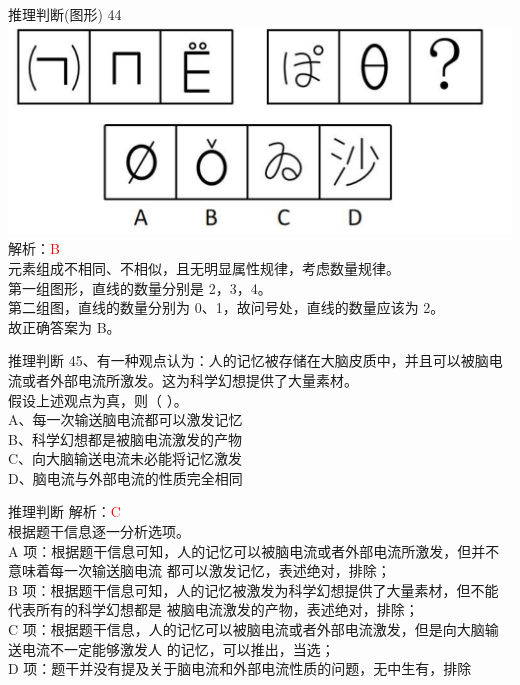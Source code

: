 \documentclass[aspectratio=169]{beamer}
\begin{document}
\begin{frame}[t]{推理判断(图形)}
    44\\
    \includegraphics[scale=0.25]{44}\\ 
    解析：\textcolor{red}{B}\\
    元素组成不相同、不相似，且无明显属性规律，考虑数量规律。\\
    第一组图形，直线的数量分别是 2，3，4。\\
    第二组图，直线的数量分别为 0、1，故问号处，直线的数量应该为 2。\\
    故正确答案为 B。\\
\end{frame}





\begin{frame}[t]{推理判断}
    45、有一种观点认为：人的记忆被存储在大脑皮质中，并且可以被脑电流或者外部电流所激发。这为科学幻想提供了大量素材。\\
    假设上述观点为真，则（ ）。      \\
    A、每一次输送脑电流都可以激发记忆\\
    B、科学幻想都是被脑电流激发的产物\\
    C、向大脑输送电流未必能将记忆激发\\
    D、脑电流与外部电流的性质完全相同\\
\end{frame}


\begin{frame}[t]{推理判断}
    解析：\textcolor{red}{C}\\
    根据题干信息逐一分析选项。\\
    A 项：根据题干信息可知，人的记忆可以被脑电流或者外部电流所激发，但并不意味着每一次输送脑电流
    都可以激发记忆，表述绝对，排除；\\
    B 项：根据题干信息可知，人的记忆被激发为科学幻想提供了大量素材，但不能代表所有的科学幻想都是
    被脑电流激发的产物，表述绝对，排除；\\
    C 项：根据题干信息，人的记忆可以被脑电流或者外部电流激发，但是向大脑输送电流不一定能够激发人
    的记忆，可以推出，当选；\\
    D 项：题干并没有提及关于脑电流和外部电流性质的问题，无中生有，排除\\
\end{frame}
\end{document}
